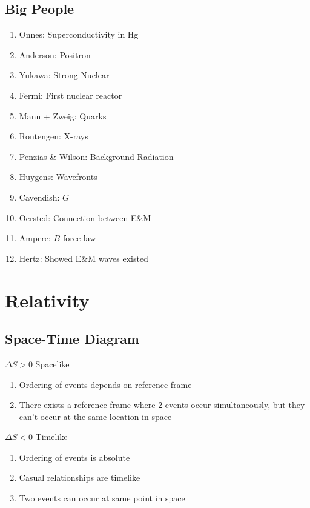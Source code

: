 \documentclass[10pt,a4paper]{article}
\begin{document}
\subsection{Big People}
\begin{enumerate}
    \item Onnes: Superconductivity in Hg 
    \item Anderson: Positron
    \item Yukawa: Strong Nuclear
    \item Fermi: First nuclear reactor
    \item Mann + Zweig: Quarks
    \item Rontengen: X-rays
    \item Penzias \& Wilson: Background Radiation
    \item Huygens: Wavefronts
    \item Cavendish: $G$
    \item Oersted: Connection between E\&M
    \item Ampere: $B$ force law
    \item Hertz: Showed E\&M waves existed
\end{enumerate}


\section{Relativity}
\subsection{Space-Time Diagram}

$\Delta S > 0$ Spacelike
\begin{enumerate}
    \item Ordering of events depends on reference frame
    \item There exists a reference frame where 2 events occur simultaneously, but they can't occur at the same location in space
\end{enumerate}
$\Delta S < 0$ Timelike
\begin{enumerate}
    \item Ordering of events is absolute
    \item Casual relationships are timelike
    \item Two events can occur at same point in space
\end{enumerate}
\end{document}
